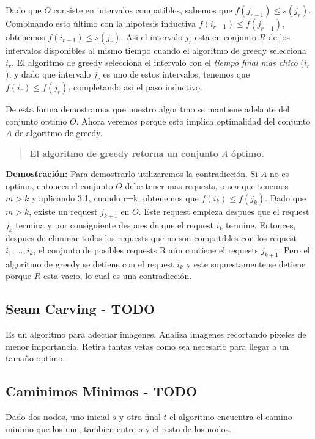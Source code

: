 \documentclass{article}
\begin{document}
Dado que \(O\) consiste en intervalos compatibles, sabemos que \(f(j_{r-1}) \leq s(j_r)\). Combinando esto último con la hipotesis inductiva \(f(i_{r-1}) \leq f(j_{r-1})\), obtenemos \(f(i_{r-1}) \leq s(j_{r})\). Asi el intervalo \(j_r\) esta en conjunto \(R\) de los intervalos disponibles al mismo tiempo cuando el algoritmo de greedy selecciona \(i_r\).
El algoritmo de greedy selecciona el intervalo con el \textit{tiempo final mas chico} (\(i_{r}\)); y dado que intervalo \(j_{r}\) es uno de estos intervalos, tenemos que \(f(i_r) \leq f(j_r)\), completando asi el paso inductivo.

De esta forma demostramos que nuestro algoritmo se mantiene adelante del conjunto optimo \(O\). Ahora veremos porque esto implica optimalidad del conjunto \(A\) de algoritmo de greedy.

\begin{quote}
    \textbf{El algoritmo de greedy retorna un conjunto \(A\) óptimo.}
\end{quote}

\textbf{Demostración:} Para demostrarlo utilizaremos la contradicción. Si \(A\) no es optimo, entonces el conjunto \(O\) debe tener mas requests, o sea que tenemos \(m>k\) y aplicando 3.1, cuando r=k, 
obtenemos que \(f(i_k) \leq f(j_k)\). Dado que \(m>k\), existe un request \(j_{k+1}\) en \(O\). Este request empieza despues que el request \(j_k\) termina y por consiguiente despues de que el request \(i_k\) termine.
Entonces, despues de eliminar todos los requests que no son compatibles con los request \(i_1,...,i_k\), el conjunto de posibles requests R aún contiene el requests \(j_{k+1}\). 
Pero el algoritmo de greedy se detiene con el request \(i_k\) y este supuestamente se detiene porque \(R\) esta vacio, lo cual es una contradicción. 


\newpage
\subsection{Seam Carving - TODO}
Es un algoritmo para adecuar imagenes. Analiza imagenes recortando pixeles de menor importancia. Retira tantas vetas como sea necesario para llegar a un tamaño optimo.


\subsection{Caminimos Minimos - TODO}

Dado dos nodos, uno inicial \(s\) y otro final \(t\) el algoritmo encuentra el camino minimo que los une, tambien entre \(s\) y el resto de los nodos.
\end{document}
